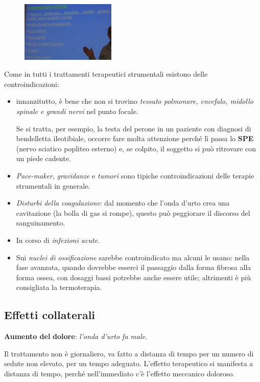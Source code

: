 \begin{figure}[!ht]
\centering
\includegraphics[width=0.4\textwidth]{025/image22.jpeg}
\end{figure}

Come in tutti i trattamenti terapeutici strumentali esistono delle
controindicazioni:

\begin{itemize}
\item
  innanzitutto, è bene che non si trovino \emph{tessuto polmonare,
  encefalo, midollo spinale e grandi nervi} nel punto focale.

Se si tratta, per esempio, la testa del perone in un paziente con
diagnosi di bendelletta ileotibiale, occorre fare molta attenzione
perché lì passa lo \textbf{SPE} (nervo sciatico popliteo esterno) e, se
colpito, il soggetto si può ritrovare con un piede cadente.

\item
  \emph{Pace-maker}, \emph{gravidanze} e \emph{tumori} sono tipiche
  controindicazioni delle terapie strumentali in generale.
\item
  \emph{Disturbi della coagulazione}: dal momento che l'onda d'urto crea
  una cavitazione (la bolla di gas si rompe), questo può peggiorare il
  discorso del sanguinamento.
\item
  In corso di \emph{infezioni acute}.
\item
  Sui \emph{nuclei di ossificazione} sarebbe controindicato ma alcuni le
  usano: nella fase avanzata, quando dovrebbe esserci il passaggio dalla
  forma fibrosa alla forma ossea, con dosaggi bassi potrebbe anche
  essere utile; altrimenti è più consigliata la termoterapia.
\end{itemize}

\subsection{Effetti collaterali}

\textbf{Aumento del} \textbf{dolore}: \emph{l'onda d'urto fa male.}

Il trattamento non è giornaliero, va fatto a distanza di tempo per un
numero di sedute non elevato, per un tempo adeguato. L'effetto
terapeutico si manifesta a distanza di tempo, perché nell'immediato c'è
l'effetto meccanico doloroso.

